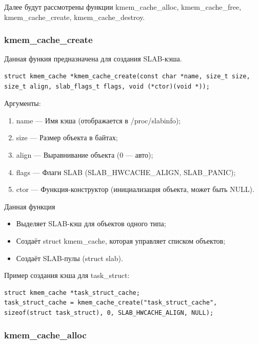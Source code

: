 Далее будут рассмотрены функции kmem\_cache\_alloc, kmem\_cache\_free, kmem\_cache\_create, kmem\_cache\_destroy.

\subsubsection*{kmem\_cache\_create}

Данная функия предназначена для создания SLAB-кэша.

\begin{lstlisting}
struct kmem_cache *kmem_cache_create(const char *name, size_t size, size_t align, slab_flags_t flags, void (*ctor)(void *));
\end{lstlisting}

Аргументы:
\begin{enumerate}
    \item name --- Имя кэша (отображается в /proc/slabinfo);
    \item size --- Размер объекта в байтах;
    \item align	--- Выравнивание объекта (0 --- авто);
    \item flags	--- Флаги SLAB (SLAB\_HWCACHE\_ALIGN, SLAB\_PANIC);
    \item ctor --- Функция-конструктор (инициализация объекта, может быть NULL).
\end{enumerate}

Данная функция
\begin{itemize}
    \item Выделяет SLAB-кэш для объектов одного типа;
    \item Создаёт struct kmem\_cache, которая управляет списком объектов;
    \item Создаёт SLAB-пулы (struct slab).
\end{itemize}

Пример создания кэша для task\_struct:

\begin{lstlisting}
struct kmem_cache *task_struct_cache;
task_struct_cache = kmem_cache_create("task_struct_cache", sizeof(struct task_struct), 0, SLAB_HWCACHE_ALIGN, NULL);
\end{lstlisting}

\subsubsection*{kmem\_cache\_alloc}

